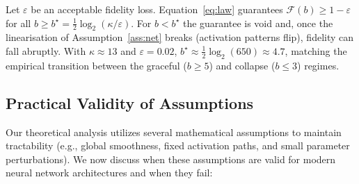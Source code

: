 \begin{corollary}
\label{cor:collapse}
Let $\varepsilon$ be an acceptable fidelity loss. Equation~\eqref{eq:law}
guarantees $\mathcal F(b)\ge1-\varepsilon$ for all $b\ge b^\star=\tfrac12
\log_2(\kappa/\varepsilon)$. For $b<b^\star$ the guarantee is void and, once the
linearisation of Assumption~\ref{ass:net} breaks (activation patterns flip),
fidelity can fall abruptly. With $\kappa\approx13$ and $\varepsilon=0.02$,
$b^\star\approx\tfrac12\log_2(650)\approx4.7$, matching the empirical transition
between the graceful ($b\ge5$) and collapse ($b\le3$) regimes.
\end{corollary}

\subsection{Practical Validity of Assumptions}
\label{sec:validity}
Our theoretical analysis utilizes several mathematical assumptions to maintain tractability (e.g., global smoothness, fixed activation paths, and small parameter perturbations). We now discuss when these assumptions are valid for modern neural network architectures and when they fail:
